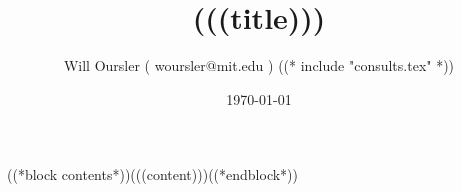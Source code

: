 \documentclass{article}
\title{(((title)))}
\date{ \today }
\author{Will Oursler ( woursler@mit.edu ) ((* include "consults.tex" *)) }
\begin{document}
\maketitle

((*block contents*))(((content)))((*endblock*))
\end{document}
